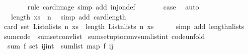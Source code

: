\begin{isabellebody}
\ \ \ \ \ \ \isamarkupfalse%
\ {\isacharparenleft}{\kern0pt}rule\ card{\isacharunderscore}{\kern0pt}image{\isacharparenright}{\kern0pt}\ {\isacharparenleft}{\kern0pt}simp\ add{\isacharcolon}{\kern0pt}\ inj{\isacharunderscore}{\kern0pt}on{\isacharunderscore}{\kern0pt}def{\isacharparenright}{\kern0pt}\isanewline
\ \ \ \ \isamarkupfalse%
\ \isamarkupfalse%
\ {\isacharquery}{\kern0pt}case\ \isamarkupfalse%
\ auto\isanewline
\ \ \isamarkupfalse%
\isanewline
\ \ \isamarkupfalse%
\ \isamarkupfalse%
\ {\isachardoublequoteopen}{\isasymdots}\ {\isacharequal}{\kern0pt}\ length\ xs\ {\isacharcircum}{\kern0pt}\ n{\isachardoublequoteclose}\ \isamarkupfalse%
\ {\isacharparenleft}{\kern0pt}simp\ add{\isacharcolon}{\kern0pt}\ card{\isacharunderscore}{\kern0pt}length{\isacharparenright}{\kern0pt}\isanewline
\ \ \isamarkupfalse%
\ \isamarkupfalse%
\ {\isachardoublequoteopen}card\ {\isacharparenleft}{\kern0pt}set\ {\isacharparenleft}{\kern0pt}List{\isachardot}{\kern0pt}n{\isacharunderscore}{\kern0pt}lists\ n\ xs{\isacharparenright}{\kern0pt}{\isacharparenright}{\kern0pt}\ {\isacharequal}{\kern0pt}\ length\ {\isacharparenleft}{\kern0pt}List{\isachardot}{\kern0pt}n{\isacharunderscore}{\kern0pt}lists\ n\ xs{\isacharparenright}{\kern0pt}{\isachardoublequoteclose}\isanewline
\ \ \ \ \isamarkupfalse%
\ {\isacharparenleft}{\kern0pt}simp\ add{\isacharcolon}{\kern0pt}\ length{\isacharunderscore}{\kern0pt}n{\isacharunderscore}{\kern0pt}lists{\isacharparenright}{\kern0pt}\isanewline
{}\isamarkupfalse%
%
\endisatagproof
{\isafoldproof}%
%
\isadelimproof
%
\endisadelimproof
%
\isadelimdocument
%
\endisadelimdocument
%
\isatagdocument
%
\isamarkuptrue%
%
\endisatagdocument
{\isafolddocument}%
%
\isadelimdocument
%
\endisadelimdocument
{}\isamarkupfalse%
\ sum{\isacharunderscore}{\kern0pt}code\ {\isacharequal}{\kern0pt}\ sum{\isachardot}{\kern0pt}set{\isacharunderscore}{\kern0pt}conv{\isacharunderscore}{\kern0pt}list\isanewline
\isanewline
{}\isamarkupfalse%
\ sum{\isacharunderscore}{\kern0pt}set{\isacharunderscore}{\kern0pt}upto{\isacharunderscore}{\kern0pt}conv{\isacharunderscore}{\kern0pt}sum{\isacharunderscore}{\kern0pt}list{\isacharunderscore}{\kern0pt}int\ {\isacharbrackleft}{\kern0pt}code{\isacharunderscore}{\kern0pt}unfold{\isacharbrackright}{\kern0pt}{\isacharcolon}{\kern0pt}\isanewline
\ \ {\isachardoublequoteopen}sum\ f\ {\isacharparenleft}{\kern0pt}set\ {\isacharbrackleft}{\kern0pt}i{\isachardot}{\kern0pt}{\isachardot}{\kern0pt}j{\isacharcolon}{\kern0pt}{\isacharcolon}{\kern0pt}int{\isacharbrackright}{\kern0pt}{\isacharparenright}{\kern0pt}\ {\isacharequal}{\kern0pt}\ sum{\isacharunderscore}{\kern0pt}list\ {\isacharparenleft}{\kern0pt}map\ f\ {\isacharbrackleft}{\kern0pt}i{\isachardot}{\kern0pt}{\isachardot}{\kern0pt}j{\isacharbrackright}{\kern0pt}{\isacharparenright}{\kern0pt}{\isachardoublequoteclose}\isanewline

\end{isabellebody}
